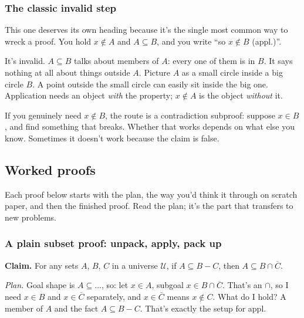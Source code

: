 \subsubsection{The classic invalid step}

This one deserves its own heading because it's the single most common way to wreck a proof. You hold $x\notin A$ and $A\subseteq B$, and you write ``so $x\notin B$ (appl.)''.

It's invalid. $A\subseteq B$ talks about members of $A$: every one of them is in $B$. It says nothing at all about things outside $A$. Picture $A$ as a small circle inside a big circle $B$. A point outside the small circle can easily sit inside the big one. Application needs an object \emph{with} the property; $x\notin A$ is the object \emph{without} it.

If you genuinely need $x\notin B$, the route is a contradiction subproof: suppose $x\in B$, and find something that breaks. Whether that works depends on what else you know. Sometimes it doesn't work because the claim is false.

\subsection{Worked proofs}

Each proof below starts with the plan, the way you'd think it through on scratch paper, and then the finished proof. Read the plan; it's the part that transfers to new problems.

\subsubsection{A plain subset proof: unpack, apply, pack up}

\textbf{Claim.} For any sets $A$, $B$, $C$ in a universe $\mathcal{U}$, if $A\subseteq B-C$, then $A\subseteq B\cap\overline{C}$.

\emph{Plan.} Goal shape is $A\subseteq\dots$, so: let $x\in A$, subgoal $x\in B\cap\overline{C}$. That's an $\cap$, so I need $x\in B$ and $x\in\overline{C}$ separately, and $x\in\overline{C}$ means $x\notin C$. What do I hold? A member of $A$ and the fact $A\subseteq B-C$. That's exactly the setup for appl.

